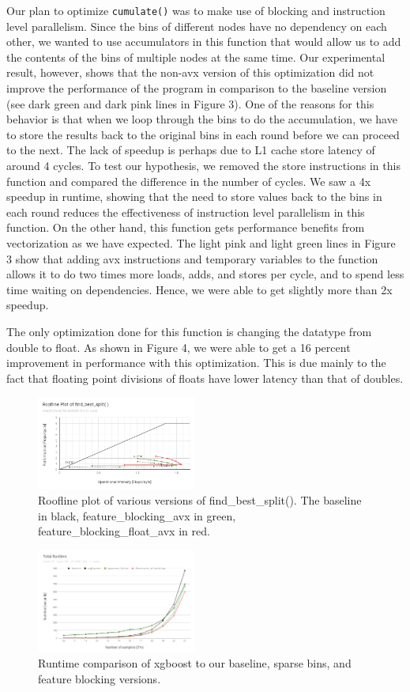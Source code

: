 Our plan to optimize \texttt{cumulate()} was to make use of blocking and instruction level parallelism. Since the bins of different nodes have no dependency on each other, we wanted to use accumulators in this function that would allow us to add the contents of the bins of multiple nodes at the same time. Our experimental result, however, shows that the non-avx version of this optimization did not improve the performance of the program in comparison to the baseline version (see dark green and dark pink lines in Figure 3). One of the reasons for this behavior is that when we loop through the bins to do the accumulation, we have to store the results back to the original bins in each round before we can proceed to the next. The lack of speedup is perhaps due to L1 cache store latency of around 4 cycles. To test our hypothesis, we removed the store instructions in this function and compared the difference in the number of cycles. We saw a 4x speedup in runtime, showing that the need to store values back to the bins in each round reduces the effectiveness of instruction level parallelism in this function. On the other hand, this function gets performance benefits from vectorization as we have expected. The light pink and light green lines in Figure 3 show that adding avx instructions and temporary variables to the function allows it to do two times more loads, adds, and stores per cycle, and to spend less time waiting on dependencies. Hence, we were able to get slightly more than 2x speedup.

The only optimization done for this function is changing the datatype from double to float. As shown in Figure 4, we were able to get a 16 percent improvement in performance with this optimization. This is due mainly to the fact that floating point divisions of floats have lower latency than that of doubles.

\begin{figure}[h]
  \includegraphics[width=0.47\textwidth]{fig/roofline.png}
  \caption{Roofline plot of various versions of find\_best\_split(). The baseline in black, feature\_blocking\_avx in green, feature\_blocking\_float\_avx in red.}
\end{figure}

\begin{figure}[ht]
  \includegraphics[width=0.47\textwidth]{fig/runtime.png}
  \caption{Runtime comparison of xgboost to our baseline, sparse bins, and feature blocking versions.}
\end{figure}